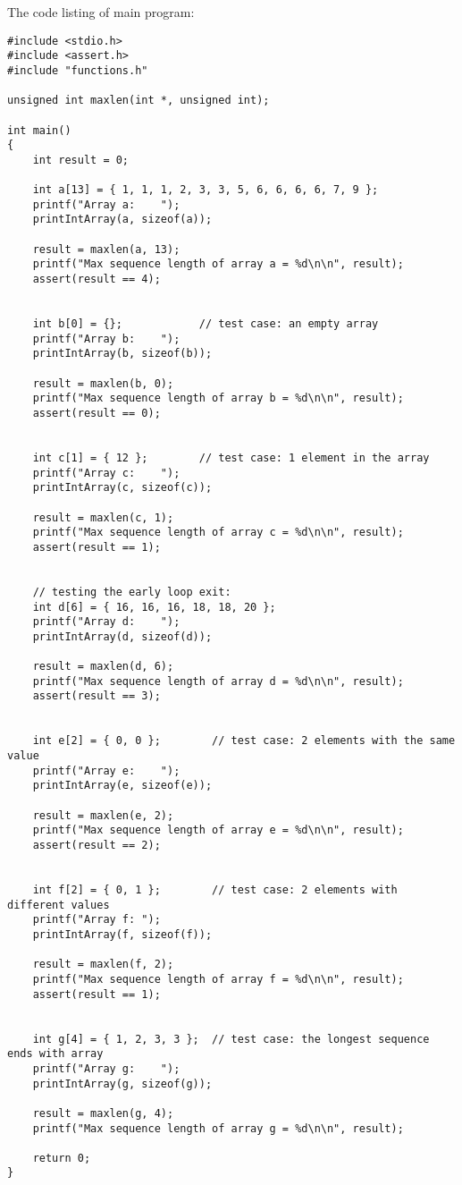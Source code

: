 \documentclass{article}
\begin{document}
		\noindent The code listing of main program:
		\begin{verbatim}
#include <stdio.h>
#include <assert.h>
#include "functions.h"

unsigned int maxlen(int *, unsigned int);

int main()
{
    int result = 0;

    int a[13] = { 1, 1, 1, 2, 3, 3, 5, 6, 6, 6, 6, 7, 9 };
    printf("Array a:    ");
    printIntArray(a, sizeof(a));

    result = maxlen(a, 13);
    printf("Max sequence length of array a = %d\n\n", result);
    assert(result == 4);


    int b[0] = {};            // test case: an empty array
    printf("Array b:    ");
    printIntArray(b, sizeof(b));

    result = maxlen(b, 0);
    printf("Max sequence length of array b = %d\n\n", result);
    assert(result == 0);


    int c[1] = { 12 };        // test case: 1 element in the array
    printf("Array c:    ");
    printIntArray(c, sizeof(c));

    result = maxlen(c, 1);
    printf("Max sequence length of array c = %d\n\n", result);
    assert(result == 1);


    // testing the early loop exit:
    int d[6] = { 16, 16, 16, 18, 18, 20 };
    printf("Array d:    ");
    printIntArray(d, sizeof(d));

    result = maxlen(d, 6);
    printf("Max sequence length of array d = %d\n\n", result);
    assert(result == 3);


    int e[2] = { 0, 0 };        // test case: 2 elements with the same value
    printf("Array e:    ");
    printIntArray(e, sizeof(e));

    result = maxlen(e, 2);
    printf("Max sequence length of array e = %d\n\n", result);
    assert(result == 2);


    int f[2] = { 0, 1 };        // test case: 2 elements with different values
    printf("Array f: ");
    printIntArray(f, sizeof(f));

    result = maxlen(f, 2);
    printf("Max sequence length of array f = %d\n\n", result);
    assert(result == 1);


    int g[4] = { 1, 2, 3, 3 };  // test case: the longest sequence ends with array
    printf("Array g:    ");
    printIntArray(g, sizeof(g));

    result = maxlen(g, 4);
    printf("Max sequence length of array g = %d\n\n", result);

    return 0;
}
		\end{verbatim}
\end{document}
